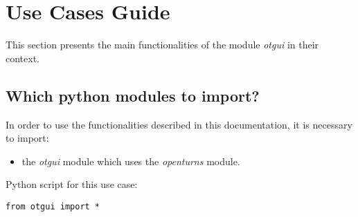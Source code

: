 % 




\section{Use Cases Guide}

This section presents the main functionalities of the module \textit{otgui} in their context.



\subsection{Which python modules to import?}

In order to use the functionalities described in this documentation, it is necessary to import: 
\begin{itemize}
   \item the \textit{otgui} module which uses the \textit{openturns} module.
\end{itemize}

Python script for this use case:

\begin{lstlisting}
from otgui import *
\end{lstlisting}



